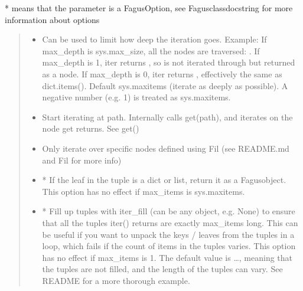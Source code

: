 \documentclass[a4paper,10pt,english]{sphinxmanual}
\begin{document}
\begin{fulllineitems}
\begin{fulllineitems}
\sphinxAtStartPar
* means that the parameter is a FagusOption, see Fagus\sphinxhyphen{}class\sphinxhyphen{}docstring for more information about options
\begin{quote}\begin{description}
\begin{itemize}
\item {}
\sphinxAtStartPar
{} \textendash{} Can be used to limit how deep the iteration goes. Example:
 If max\_depth is sys.max\_size, all the nodes are traversed:
\sphinxcode{\sphinxupquote{{[}("a", "b", "c"), ("a", "b", "d"{]}), ("e", "f"){]}}}. If max\_depth is 1, iter returns
\sphinxcode{\sphinxupquote{{[}("a", "b", {[}"c", "d"{]}), ("e", "f"){]}}}, so \sphinxcode{\sphinxupquote{{[}"c", "d"{]}}} is not iterated through but returned as a
node. If max\_depth is 0, iter returns , effectively the same
as dict.items(). Default sys.maxitems (iterate as deeply as possible). A negative number (e.g. \sphinxhyphen{}1) is
treated as sys.maxitems.

\item {}
\sphinxAtStartPar
{} \textendash{} Start iterating at path. Internally calls get(path), and iterates on the node get returns. See get()

\item {}
\sphinxAtStartPar
{} \textendash{} Only iterate over specific nodes defined using Fil (see README.md and Fil for more info)

\item {}
\sphinxAtStartPar
{} \textendash{} * If the leaf in the tuple is a dict or list, return it as a Fagus\sphinxhyphen{}object. This option has no
effect if max\_items is sys.maxitems.

\item {}
\sphinxAtStartPar
{} \textendash{} * Fill up tuples with iter\_fill (can be any object, e.g. None) to ensure that all the tuples
iter() returns are exactly max\_items long. This can be useful if you want to unpack the keys / leaves
from the tuples in a loop, which fails if the count of items in the tuples varies. This option has no
effect if max\_items is \sphinxhyphen{}1. The default value is …, meaning that the tuples are not filled, and the
length of the tuples can vary. See README for a more thorough example.


\end{itemize}
\end{description}
\end{quote}
\end{fulllineitems}
\end{fulllineitems}
\end{document}
